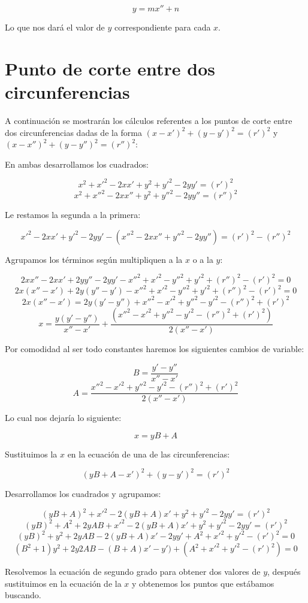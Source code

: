 $$y = mx'' + n$$

Lo que nos dará el valor de $y$ correspondiente para cada $x$.\par

\section{Punto de corte entre dos circunferencias}\label{c-c}

A continuación se mostrarán los cálculos referentes a los puntos de corte entre dos circunferencias dadas de la forma $(x-x')^2 + (y -y')^2 = (r')^2$ y $(x-x'')^2 + (y -y'')^2 = (r'')^2$: \par

En ambas desarrollamos los cuadrados:\par

$$x^2 + x'^2 - 2xx' + y^2 + y'^2 - 2yy' = (r')^2$$
$$x^2 + x''^2 - 2xx'' + y^2 + y''^2 - 2yy'' = (r'')^2$$

Le restamos la segunda a la primera:\par

$$x'^2 - 2xx' + y'^2 - 2yy' -(x''^2 - 2xx'' + y''^2 - 2yy'') = (r')^2 - (r'')^2$$

Agrupamos los términos según multipliquen a la $x$ o a la $y$:\par

$$ 2xx'' - 2xx' + 2yy'' - 2yy' - x''^2 + x'^2 - y''^2 + y'^2 + (r'')^2 - (r')^2 = 0$$
$$ 2x(x'' - x') + 2y(y'' - y') - x''^2 + x'^2 - y''^2 + y'^2 + (r'')^2 - (r')^2 = 0$$
$$ 2x(x'' - x') = 2y(y' - y'') + x''^2 - x'^2 + y''^2 - y'^2 - (r'')^2 + (r')^2 $$
$$ x =\frac{y(y' - y'')}{x'' - x'} + \frac{(x''^2 - x'^2 + y''^2 - y'^2 - (r'')^2 + (r')^2)}{2(x'' - x')} $$

Por comodidad al ser todo constantes haremos los siguientes cambios de variable:\par

$$B = \frac{y' - y''}{x'' - x'}$$
$$A = \frac{x''^2 - x'^2 + y''^2 - y'^2 - (r'')^2 + (r')^2}{2(x'' - x')}$$

Lo cual nos dejaría lo siguiente:\par

$$ x = yB + A$$

Sustituimos la $x$ en la ecuación de una de las circunferencias:\par

$$(yB + A-x')^2 + (y -y')^2 = (r')^2$$

Desarrollamos los cuadrados y agrupamos:\par

$$(yB + A)^2 + x'^2 - 2(yB + A)x' + y^2 + y'^2 - 2yy' = (r')^2$$
$$ (yB)^2 + A^2 + 2yAB + x'^2 - 2(yB + A)x' + y^2 + y'^2 - 2yy' = (r')^2$$
$$ (yB)^2 + y^2 + 2yAB - 2(yB + A)x' - 2yy' + A^2 + x'^2 + y'^2 - (r')^2 = 0$$
$$ (B^2 + 1)y^2 + 2y2AB - (B + A)x' - y') + (A^2 + x'^2 + y'^2 - (r')^2) = 0$$

Resolvemos la ecuación de segundo grado para obtener dos valores de $y$, después sustituimos en la ecuación de la $x$ y obtenemos los puntos que estábamos buscando.\par
